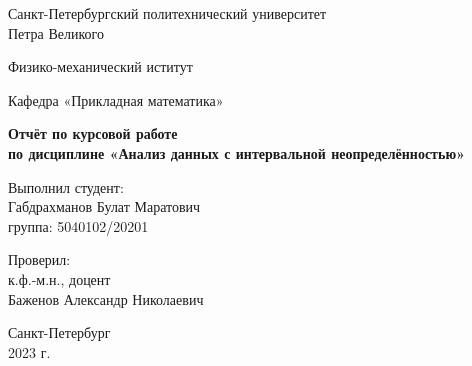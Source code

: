 \begin{titlepage}
	\begin{center}
		{\large Санкт-Петербургский политехнический университет\\Петра Великого\\}
	\end{center}
	
	\begin{center}
		{\large Физико-механический иститут}
	\end{center}
	
	
	\begin{center}
		{\large Кафедра «Прикладная математика»}
	\end{center}
	
	\vspace{8em}
	
	\begin{center}
		{\bfseries Отчёт по курсовой работе\\по дисциплине «Анализ данных с интервальной неопределённостью»}
	\end{center}
	
	\vspace{5em}
	
	\begin{flushleft}
		\hspace{16em}Выполнил студент:\\\hspace{16em}Габдрахманов Булат Маратович\\\hspace{16em}группа: 5040102/20201
		
		\vspace{2em}
		
		\hspace{16em}Проверил:\\\hspace{16em}к.ф.-м.н., доцент\\\hspace{16em}Баженов Александр Николаевич
		
	\end{flushleft}
	
	
	\vspace{6em}
	
	
	\begin{center}
		Санкт-Петербург\\2023 г.
	\end{center}	
	
\end{titlepage}